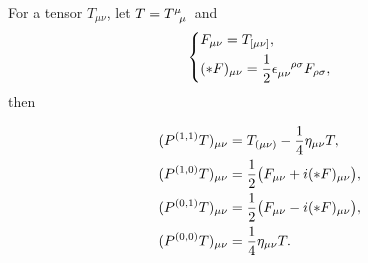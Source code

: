 For a tensor $T_{\mu \nu}$, let $T = \tensor{T}{^\mu_\mu}$ and
\begin{equation}
    \begin{dcases}
        F_{\mu \nu} = T_{[\mu \nu]}, \\
        (* F)_{\mu \nu} = \frac{1}{2} \tensor{\epsilon}{_{\mu \nu}^{\rho \sigma}} F_{\rho \sigma},
    \end{dcases}
\end{equation}
then
\begin{framed}
    \begin{align}
        (P^{(1, 1)} T)_{\mu \nu} & = T_{(\mu \nu)} - \frac{1}{4} \eta_{\mu \nu} T, \notag \\
        (P^{(1, 0)} T)_{\mu \nu} & = \frac{1}{2} \bigl(F_{\mu \nu} + i (* F)_{\mu \nu} \bigr), \notag \\
        (P^{(0, 1)} T)_{\mu \nu} & = \frac{1}{2} \bigl(F_{\mu \nu} - i (* F)_{\mu \nu} \bigr), \notag \\
        (P^{(0, 0)} T)_{\mu \nu} & = \frac{1}{4} \eta_{\mu \nu} T.
    \end{align}
\end{framed}

